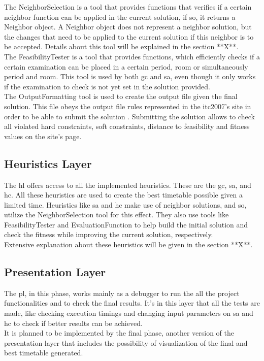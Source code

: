 The NeighborSelection is a tool that provides functions that verifies if a certain neighbor function can be applied in the current solution, if so, it returns a Neighbor object. A Neighbor object does not represent a neighbor solution, but the changes that need to be applied to the current solution if this neighbor is to be accepted. Details about this tool will be explained in the {\color{red}section **X**}.\\

The FeasibilityTester is a tool that provides functions, which efficiently checks if a certain examination can be placed in a certain period, room or simultaneously period and room. This tool is used by both \gls{gc} and \gls{sa}, even though it only works if the examination to check is not yet set in the solution provided.\\

The OutputFormatting tool is used to create the output file given the final solution. This file obeys the output file rules represented in the \gls{itc2007}'s site \cite{McCollum2007b} in order to be able to submit the solution \cite{McCollum2007c}. Submitting the solution allows to check all violated hard constraints, soft constraints, distance to feasibility and fitness values on the site's page.

\subsection{Heuristics Layer}

The \gls{hl} offers access to all the implemented heuristics. These are the \gls{gc}, \gls{sa}, and \gls{hc}. All these heuristics are used to create the best timetable possible given a limited time. Heuristics like \gls{sa} and \gls{hc} make use of neighbor solutions, and so, utilize the NeighborSelection tool for this effect. They also use tools like FeasibilityTester and EvaluationFunction to help build the initial solution and check the fitness while improving the current solution, respectively.\\

Extensive explanation about these heuristics will be given in the {\color{red}section **X**}.

\subsection{Presentation Layer}

The \gls{pl}, in this phase, works mainly as a debugger to run the all the project functionalities and to check the final results. It's in this layer that all the tests are made, like checking execution timings and changing input parameters on \gls{sa} and \gls{hc} to check if better results can be achieved.\\

It is planned to be implemented by the final phase, another version of the presentation layer that includes the possibility of visualization of the final and best timetable generated.













